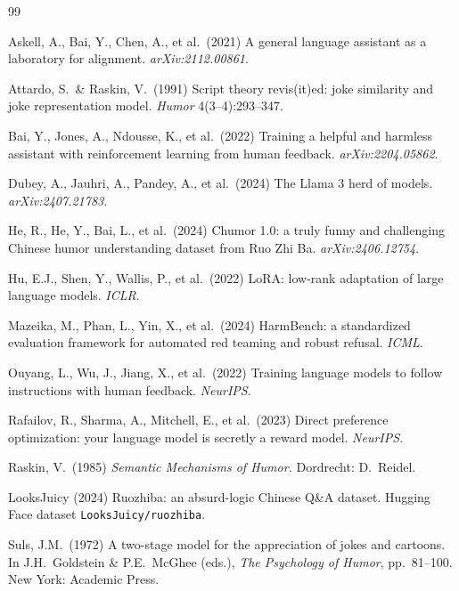 \documentclass{article}
\begin{document}
\small
\begin{thebibliography}{99}

 Askell, A., Bai, Y., Chen, A., et al.\ (2021) A general language assistant as a laboratory for alignment. \textit{arXiv:2112.00861}.

 Attardo, S.\ \& Raskin, V.\ (1991) Script theory revis(it)ed: joke similarity and joke representation model. \textit{Humor} 4(3--4):293--347.

 Bai, Y., Jones, A., Ndousse, K., et al.\ (2022) Training a helpful and harmless assistant with reinforcement learning from human feedback. \textit{arXiv:2204.05862}.

 Dubey, A., Jauhri, A., Pandey, A., et al.\ (2024) The Llama 3 herd of models. \textit{arXiv:2407.21783}.

 He, R., He, Y., Bai, L., et al.\ (2024) Chumor 1.0: a truly funny and challenging Chinese humor understanding dataset from Ruo Zhi Ba. \textit{arXiv:2406.12754}.

 Hu, E.J., Shen, Y., Wallis, P., et al.\ (2022) LoRA: low-rank adaptation of large language models. \textit{ICLR}.

 Mazeika, M., Phan, L., Yin, X., et al.\ (2024) HarmBench: a standardized evaluation framework for automated red teaming and robust refusal. \textit{ICML}.

 Ouyang, L., Wu, J., Jiang, X., et al.\ (2022) Training language models to follow instructions with human feedback. \textit{NeurIPS}.

 Rafailov, R., Sharma, A., Mitchell, E., et al.\ (2023) Direct preference optimization: your language model is secretly a reward model. \textit{NeurIPS}.

 Raskin, V.\ (1985) \textit{Semantic Mechanisms of Humor.} Dordrecht: D.\ Reidel.

 LooksJuicy (2024) Ruozhiba: an absurd-logic Chinese Q\&A dataset. Hugging Face dataset \texttt{LooksJuicy/ruozhiba}.

 Suls, J.M.\ (1972) A two-stage model for the appreciation of jokes and cartoons. In J.H.\ Goldstein \& P.E.\ McGhee (eds.), \textit{The Psychology of Humor}, pp.\ 81--100. New York: Academic Press.


\end{thebibliography}
\end{document}
